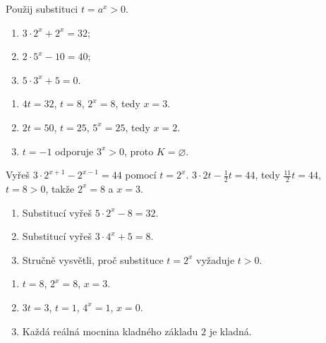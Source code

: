 \documentclass[11pt,a4paper]{article}
\begin{document}
\begin{zadaniReseniBox}[title={Samostatná práce 1}]
Použij substituci $t=a^x>0$.
\begin{enumerate}[label=\alph*)]
\item $3\cdot2^x+2^x=32$;
\item $2\cdot5^x-10=40$;
\item $5\cdot3^x+5=0$.
\end{enumerate}
\tcblower
\begin{enumerate}[label=\alph*)]
\item $4t=32$, $t=8$, $2^x=8$, tedy $x=3$.
\item $2t=50$, $t=25$, $5^x=25$, tedy $x=2$.
\item $t=-1$ odporuje $3^x>0$, proto $K=\varnothing$.
\end{enumerate}
\end{zadaniReseniBox}
\begin{zadaniReseniBox}[title={Rozšíření 1}]
Vyřeš $3\cdot2^{x+1}-2^{x-1}=44$ pomocí $t=2^x$.
\tcblower
$3\cdot2t-\frac12t=44$, tedy $\frac{11}{2}t=44$, $t=8>0$, takže $2^x=8$ a $x=3$.
\end{zadaniReseniBox}
\begin{zadaniReseniBox}[title={Domácí úkol}]
\begin{enumerate}[label=\alph*)]
\item Substitucí vyřeš $5\cdot2^x-8=32$.
\item Substitucí vyřeš $3\cdot4^x+5=8$.
\item Stručně vysvětli, proč substituce $t=2^x$ vyžaduje $t>0$.
\end{enumerate}
\tcblower
\begin{enumerate}[label=\alph*)]
\item $t=8$, $2^x=8$, $x=3$.
\item $3t=3$, $t=1$, $4^x=1$, $x=0$.
\item Každá reálná mocnina kladného základu $2$ je kladná.
\end{enumerate}
\end{zadaniReseniBox}
\end{document}
